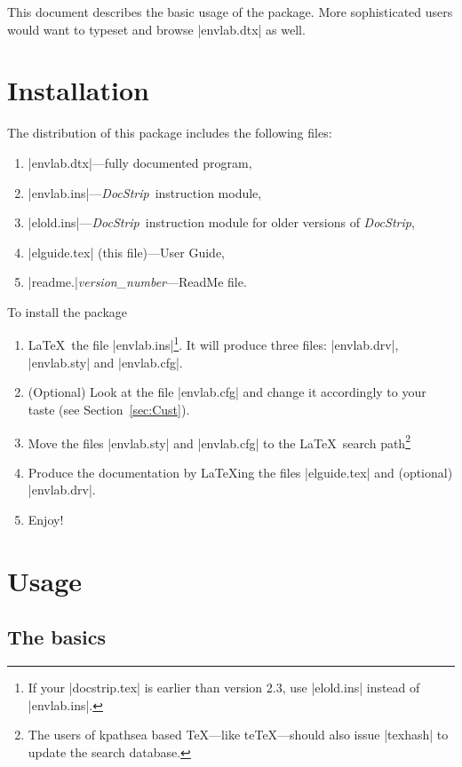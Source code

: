 \documentclass{ltxguide}
\newcommand{\DS}{\textsl{DocStrip}}
\begin{document}
This document describes the basic usage of the package. More
sophisticated users would want to typeset and browse |envlab.dtx| as
well. 

\section{Installation}
\label{sec:Install}

The distribution of this package includes the following files:
\begin{enumerate}
\item |envlab.dtx|---fully documented program,
\item |envlab.ins|---\DS\ instruction module,
\item |elold.ins|---\DS\ instruction module for older
  versions of \DS,
\item |elguide.tex| (this file)---User Guide,
\item |readme.|\emph{version\_number}---ReadMe file.
\end{enumerate}
To install the package
\begin{enumerate}
\item \LaTeX\ the file |envlab.ins|\footnote{If your |docstrip.tex| is
    earlier than version 2.3, use |elold.ins| instead of
    |envlab.ins|.}.  It will produce three files: |envlab.drv|,
  |envlab.sty| and |envlab.cfg|.
\item (Optional) Look at the file |envlab.cfg| and change it
  accordingly to your taste (see Section~\ref{sec:Cust}).
\item Move the files |envlab.sty| and  |envlab.cfg| to the
  \LaTeX\ search path\footnote{The users of kpathsea based \TeX---like
  te\TeX---should also issue |texhash| to update the search database.}
\item Produce the documentation by \LaTeX ing the files |elguide.tex|
  and (optional) |envlab.drv|.
\item Enjoy!
\end{enumerate}


\section{Usage}
\label{sec:Usage}


\subsection{The basics}
\label{sec:Basics}
\end{document}
